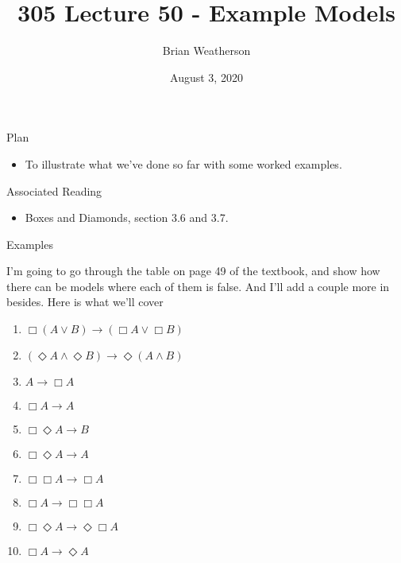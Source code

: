 \documentclass[
  ignorenonframetext,
]{beamer}
\title{305 Lecture 50 - Example Models}
\author{Brian Weatherson}
\date{August 3, 2020}
\providecommand{\tightlist}{%
  \setlength{\itemsep}{0pt}\setlength{\parskip}{0pt}}
\renewcommand{\,}{\text{, }}
\begin{document}
\frame{\titlepage}

\begin{frame}{Plan}
\protect\hypertarget{plan}{}

\begin{itemize}
\tightlist
\item
  To illustrate what we've done so far with some worked examples.
\end{itemize}

\end{frame}

\begin{frame}{Associated Reading}
\protect\hypertarget{associated-reading}{}

\begin{itemize}
\tightlist
\item
  Boxes and Diamonds, section 3.6 and 3.7.
\end{itemize}

\end{frame}

\begin{frame}{Examples}
\protect\hypertarget{examples}{}

I'm going to go through the table on page 49 of the textbook, and show
how there can be models where each of them is false. And I'll add a
couple more in besides. \pause Here is what we'll cover

\begin{enumerate}
\tightlist
\item
  \(\Box(A \vee B) \rightarrow (\Box A \vee \Box B)\)
\item
  \((\Diamond A \wedge \Diamond B) \rightarrow \Diamond (A \wedge B)\)
\item
  \(A \rightarrow \Box A\)
\item
  \(\Box A \rightarrow A\)
\item
  \(\Box \Diamond A \rightarrow B\)
\item
  \(\Box \Diamond A \rightarrow A\)
\item
  \(\Box \Box A \rightarrow \Box A\)
\item
  \(\Box A \rightarrow \Box \Box A\)
\item
  \(\Box \Diamond A \rightarrow \Diamond \Box A\)
\item
  \(\Box A \rightarrow \Diamond A\)
\end{enumerate}

\end{frame}
\end{document}
